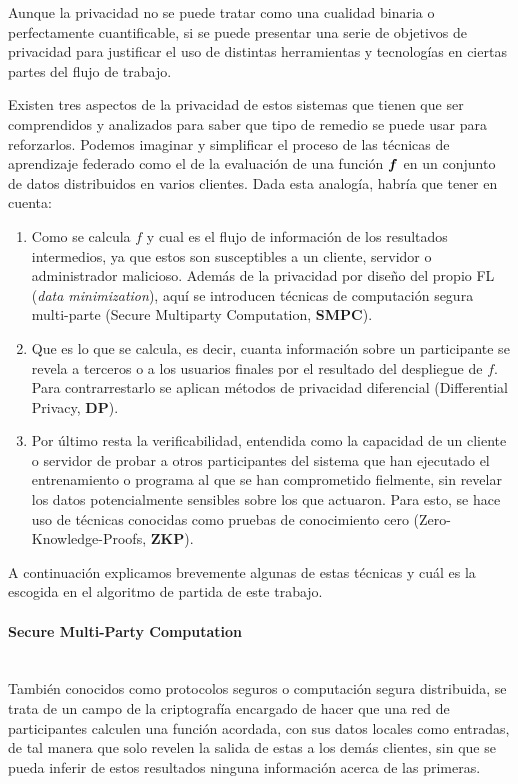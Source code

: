 \documentclass[00-Trabajo_Final.tex]{subfiles}
\begin{document}
Aunque la privacidad no se puede tratar como una cualidad binaria o perfectamente cuantificable, si se puede presentar una serie de objetivos de privacidad para justificar el uso de distintas herramientas y tecnologías en ciertas partes del flujo de trabajo.

Existen tres aspectos de la privacidad de estos sistemas que tienen que ser comprendidos y analizados para saber que tipo de remedio se puede usar para reforzarlos. Podemos imaginar y simplificar el proceso de las técnicas de aprendizaje federado como el de la evaluación de una función $\boldsymbol{f}$ en un conjunto de datos distribuidos en varios clientes. Dada esta analogía, habría que tener en cuenta:

\begin{enumerate}[itemsep=2pt]
    \item Como se calcula $f$ y cual es el flujo de información de los resultados intermedios, ya que estos son susceptibles a un cliente, servidor o administrador malicioso. Además de la privacidad por diseño del propio FL (\textit{data minimization}), aquí se introducen técnicas de computación segura multi-parte (Secure Multiparty Computation, \textbf{SMPC}).
    \item Que es lo que se calcula, es decir, cuanta información sobre un participante se revela a terceros o a los usuarios finales por el resultado del despliegue de $f$. Para contrarrestarlo se aplican métodos de privacidad diferencial (Differential Privacy, \textbf{DP}).
    \item Por último resta la verificabilidad, entendida como la capacidad de un cliente o servidor de probar a otros participantes del sistema que han ejecutado el entrenamiento o programa al que se han comprometido fielmente, sin revelar los datos potencialmente sensibles sobre los que actuaron. Para esto, se hace uso de técnicas conocidas como pruebas de conocimiento cero (Zero-Knowledge-Proofs, \textbf{ZKP}).
\end{enumerate}

A continuación explicamos brevemente algunas de estas técnicas y cuál es la escogida en el algoritmo de partida de este trabajo.

\paragraph*{Secure Multi-Party Computation}\mbox{}\\
También conocidos como protocolos seguros o computación segura distribuida, se trata de un campo de la criptografía encargado de hacer que una red de participantes calculen una función acordada, con sus datos locales como entradas, de tal manera que solo revelen la salida de estas a los demás clientes, sin que se pueda inferir de estos resultados ninguna información acerca de las primeras.
\end{document}
